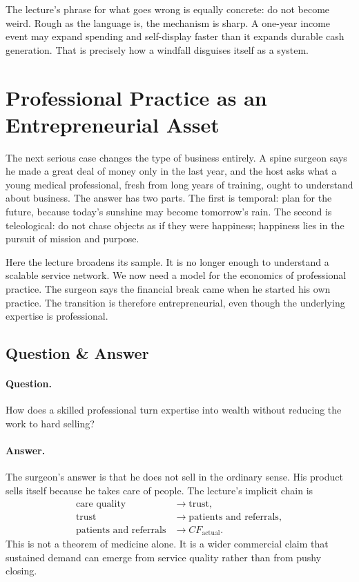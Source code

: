 The lecture's phrase for what goes wrong is equally concrete: do not become weird. Rough as the language is, the mechanism is sharp. A one-year income event may expand spending and self-display faster than it expands durable cash generation. That is precisely how a windfall disguises itself as a system.

\section{Professional Practice as an Entrepreneurial Asset}

The next serious case changes the type of business entirely. A spine surgeon says he made a great deal of money only in the last year, and the host asks what a young medical professional, fresh from long years of training, ought to understand about business. The answer has two parts. The first is temporal: plan for the future, because today's sunshine may become tomorrow's rain. The second is teleological: do not chase objects as if they were happiness; happiness lies in the pursuit of mission and purpose.

Here the lecture broadens its sample. It is no longer enough to understand a scalable service network. We now need a model for the economics of professional practice. The surgeon says the financial break came when he started his own practice. The transition is therefore entrepreneurial, even though the underlying expertise is professional.

\subsection{Question \& Answer}

\paragraph{Question.} How does a skilled professional turn expertise into wealth without reducing the work to hard selling?

\paragraph{Answer.} The surgeon's answer is that he does not sell in the ordinary sense. His product sells itself because he takes care of people. The lecture's implicit chain is
\begin{align}
\text{care quality} &\longrightarrow \text{trust}, \\
\text{trust} &\longrightarrow \text{patients and referrals}, \\
\text{patients and referrals} &\longrightarrow CF_{\text{actual}}.
\end{align}
This is not a theorem of medicine alone. It is a wider commercial claim that sustained demand can emerge from service quality rather than from pushy closing.

